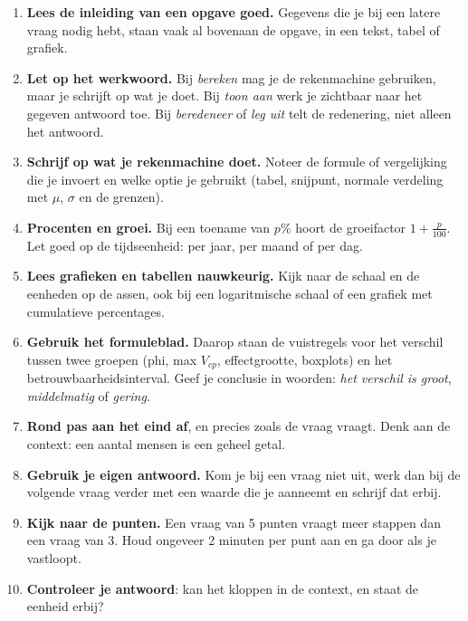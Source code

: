 {\small\opmaakproza
\begin{enumerate}[leftmargin=1.5em,itemsep=3pt,label=\textcolor{kleur1}{\sffamily\bfseries\arabic*}]
\item \textbf{Lees de inleiding van een opgave goed.} Gegevens die je bij een latere vraag nodig hebt, staan vaak
  al bovenaan de opgave, in een tekst, tabel of grafiek.
\item \textbf{Let op het werkwoord.} Bij \emph{bereken} mag je de rekenmachine gebruiken, maar je schrijft op wat je
  doet. Bij \emph{toon aan} werk je zichtbaar naar het gegeven antwoord toe. Bij \emph{beredeneer} of \emph{leg uit}
  telt de redenering, niet alleen het antwoord.
\item \textbf{Schrijf op wat je rekenmachine doet.} Noteer de formule of vergelijking die je invoert en welke optie je
  gebruikt (tabel, snijpunt, normale verdeling met $\mu$, $\sigma$ en de grenzen).
\item \textbf{Procenten en groei.} Bij een toename van $p\%$ hoort de groeifactor $1 + \frac{p}{100}$. Let goed op de
  tijdseenheid: per jaar, per maand of per dag.
\item \textbf{Lees grafieken en tabellen nauwkeurig.} Kijk naar de schaal en de eenheden op de assen, ook bij een
  logaritmische schaal of een grafiek met cumulatieve percentages.
\item \textbf{Gebruik het formuleblad.} Daarop staan de vuistregels voor het verschil tussen twee groepen (phi,
  max $V_{cp}$, effectgrootte, boxplots) en het betrouwbaarheidsinterval. Geef je conclusie in woorden:
  \emph{het verschil is groot}, \emph{middelmatig} of \emph{gering}.
\item \textbf{Rond pas aan het eind af}, en precies zoals de vraag vraagt. Denk aan de context: een aantal mensen is
  een geheel getal.
\item \textbf{Gebruik je eigen antwoord.} Kom je bij een vraag niet uit, werk dan bij de volgende vraag verder met een
  waarde die je aanneemt en schrijf dat erbij.
\item \textbf{Kijk naar de punten.} Een vraag van 5 punten vraagt meer stappen dan een vraag van 3. Houd ongeveer
  2 minuten per punt aan en ga door als je vastloopt.
\item \textbf{Controleer je antwoord}: kan het kloppen in de context, en staat de eenheid erbij?
\end{enumerate}\par}
